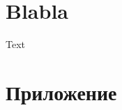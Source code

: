 \documentclass[oneside,final,14pt]{extreport}
\begin{document}
\tableofcontents
\chapter{Blabla}







\begin{thebibliography}{0}




 Text







\end{thebibliography}
\appendix
\chapter{Приложение}\label{AppendixA}
\end{document}
